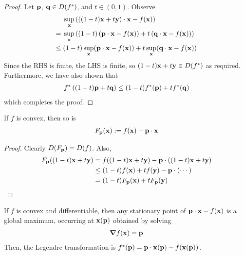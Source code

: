 \documentclass{../../template/note}
\begin{document}
    \begin{proof}
        Let $\V p$, $\V q \in D(f^*)$, and $t \in (0, 1)$. Observe
        \begin{align*}
            &\;\sup_{\V x} \left(\left((1-t)\V x + t\V y\right) \cdot \V x - f(\V x)\right) \\
            =&\; \sup_{\V x} \left((1-t)\left(\V p \cdot \V x - f(\V x)\right) + t\left(\V q \cdot \V x - f(\V x)\right)\right) \\
            \leq&\; (1-t) \sup_{\V x} (\V p \cdot \V x - f(\V x)) + t \sup_{\V x} (\V q \cdot \V x - f(\V x))
        \end{align*}
        Since the RHS is finite, the LHS is finite, so $(1-t)\V x + t\V y \in D(f^*)$ as required. Furthermore, we have also shown that
        \begin{align*}
            f^*\left((1-t)\V p + t\V q\right) \leq (1-t)f^*(\V p) + tf^*(\V q)
        \end{align*}
        which completes the proof.
    \end{proof}
    
    \begin{lemma}
        If $f$ is convex, then so is
        \begin{align*}
            F_{\V p}(\V x) := f(\V x) - \V p \cdot \V x
        \end{align*}
    \end{lemma}
    
    \begin{proof}
        Clearly $D(F_{\V p}) = D(f)$. Also,
        \begin{align*}
            F_{\V p}((1-t)\V x + t\V y) &= f((1-t) \V x + t\V y) - \V p \cdot ((1-t)\V x + t\V y) \\
            &\leq (1-t)f(\V x) + tf(\V y) - \V p \cdot (\cdots) \\
            &= (1-t)F_{\V p}(\V x) + tF_{\V p}(\V y)
        \end{align*}
    \end{proof}
    
    \begin{corollary}
        \label{magic-formula}
        If $f$ is convex and differentiable, then any stationary point of $\V p \cdot \V x - f(\V x)$ is a global maximum, occurring at $\V x(\V p)$ obtained by solving
        \begin{align*}
            \grad f(\V x) = \V p
        \end{align*}
        Then, the Legendre transformation is $f^*(\V p) = \V p \cdot \V x(\V p) - f(\V x(\V p))$.        
    \end{corollary}
    
\end{document}
